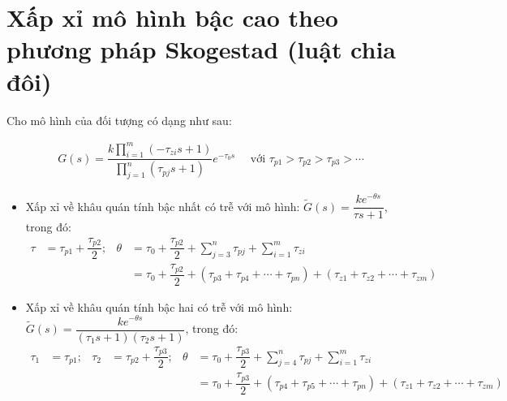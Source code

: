 \section{Xấp xỉ mô hình bậc cao theo phương pháp Skogestad (luật chia đôi)}

    Cho mô hình của đối tượng có dạng như sau:

    \begin{align*}
        G(s) = \dfrac{\displaystyle k \prod_{i=1}^m \left({-\tau_{zi} s + 1}\right)}{\displaystyle \prod_{j=1}^n \left({\tau_{pj} s + 1}\right)} e^{-\tau_0 s} \quad \textrm{ với } \tau_{p1} > \tau_{p2} > \tau_{p3} > \cdots
    \end{align*}

    \begin{itemize}
        \item Xấp xỉ về khâu quán tính bậc nhất có trễ với mô hình: $\tilde{G}(s) = \dfrac{k e^{-\theta s}}{\tau s + 1}$, trong đó:
            \begin{align*}
                \tau & = \tau_{p1} + \dfrac{\tau_{p2}}{2}; &
                \theta & = \tau_0 + \dfrac{\tau_{p2}}{2} + \sum_{j = 3}^n \tau_{pj} + \sum_{i = 1}^m \tau_{zi} \\
                & & & = \tau_0 + \dfrac{\tau_{p2}}{2} + \left({\tau_{p3} + \tau_{p4} + \cdots + \tau_{pn}}\right) + \left({\tau_{z1} + \tau_{z2} + \cdots + \tau_{zm}}\right)
            \end{align*}

        \item Xấp xỉ về khâu quán tính bậc hai có trễ với mô hình: $\tilde{G}(s) = \dfrac{k e^{-\theta s}}{\left({\tau_1 s + 1}\right) \left({\tau_2 s + 1}\right)}$, trong đó:
            \begin{align*}
                \tau_1 & = \tau_{p1}; & \tau_2 & = \tau_{p2} + \dfrac{\tau_{p3}}{2}; &
                \theta & = \tau_0 + \dfrac{\tau_{p3}}{2} + \sum_{j = 4}^n \tau_{pj} + \sum_{i = 1}^m \tau_{zi} \\
                & & & & & = \tau_0 + \dfrac{\tau_{p3}}{2} + \left({\tau_{p4} + \tau_{p5} + \cdots + \tau_{pn}}\right) + \left({\tau_{z1} + \tau_{z2} + \cdots + \tau_{zm}}\right)
                \end{align*}
    \end{itemize}

